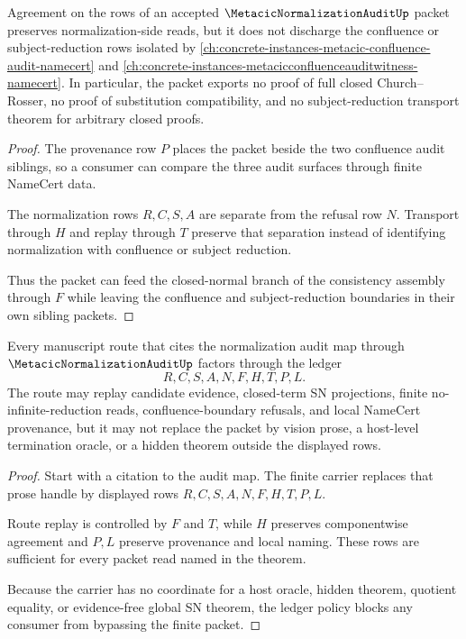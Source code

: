 \begin{theorem}
\label{thm:metacic-normalization-audit-confluence-boundary}
Agreement on the rows of an accepted $\MetacicNormalizationAuditUp$ packet preserves normalization-side reads, but it does not discharge the confluence or subject-reduction rows isolated by \autoref{ch:concrete-instances-metacic-confluence-audit-namecert} and \autoref{ch:concrete-instances-metacicconfluenceauditwitness-namecert}. In particular, the packet exports no proof of full closed Church--Rosser, no proof of substitution compatibility, and no subject-reduction transport theorem for arbitrary closed proofs.
\end{theorem}
\begin{proof}
The provenance row $P$ places the packet beside the two confluence audit siblings, so a consumer can compare the three audit surfaces through finite NameCert data.

The normalization rows $R,C,S,A$ are separate from the refusal row $N$. Transport through $H$ and replay through $T$ preserve that separation instead of identifying normalization with confluence or subject reduction.

Thus the packet can feed the closed-normal branch of the consistency assembly through $F$ while leaving the confluence and subject-reduction boundaries in their own sibling packets.
\end{proof}

\begin{theorem}
\label{thm:metacic-normalization-audit-ledger-policy}
Every manuscript route that cites the normalization audit map through $\MetacicNormalizationAuditUp$ factors through the ledger
$$
R,C,S,A,N,F,H,T,P,L.
$$
The route may replay candidate evidence, closed-term SN projections, finite no-infinite-reduction reads, confluence-boundary refusals, and local NameCert provenance, but it may not replace the packet by vision prose, a host-level termination oracle, or a hidden theorem outside the displayed rows.
\end{theorem}
\begin{proof}
Start with a citation to the audit map. The finite carrier replaces that prose handle by displayed rows $R,C,S,A,N,F,H,T,P,L$.

Route replay is controlled by $F$ and $T$, while $H$ preserves componentwise agreement and $P,L$ preserve provenance and local naming. These rows are sufficient for every packet read named in the theorem.

Because the carrier has no coordinate for a host oracle, hidden theorem, quotient equality, or evidence-free global SN theorem, the ledger policy blocks any consumer from bypassing the finite packet.
\end{proof}


